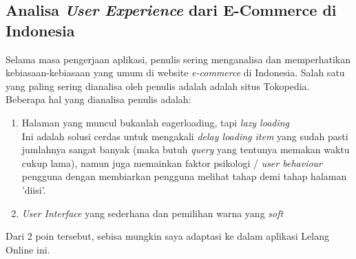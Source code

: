 	\subsection{Analisa \textit{User Experience} dari E-Commerce di Indonesia}
    \label{alasan-ux-ecommerce-indonesia alasan-app-serupa}
    Selama masa pengerjaan aplikasi, penulis sering menganalisa dan memperhatikan kebiasaan-kebiasaan yang umum di website \textit{e-commerce} di Indonesia. Salah satu yang paling sering dianalisa oleh penulis adalah adalah situs Tokopedia.
    \\
    \indent Beberapa hal yang dianalisa penulis adalah:
    \begin{enumerate}
    \item Halaman yang muncul bukanlah eagerloading, tapi \textit{lazy loading}\\
    \indent Ini adalah solusi cerdas untuk mengakali \textit{delay loading item} yang sudah pasti jumlahnya sangat banyak (maka butuh \textit{query} yang tentunya memakan waktu cukup lama), namun juga memainkan faktor psikologi / \textit{user behaviour} pengguna dengan membiarkan pengguna melihat tahap demi tahap halaman 'diisi'.
    \item \textit{User Interface} yang sederhana dan pemilihan warna yang \textit{soft}
    \end{enumerate}
    Dari 2 poin tersebut, sebisa mungkin saya adaptasi ke dalam aplikasi Lelang Online ini.
    
